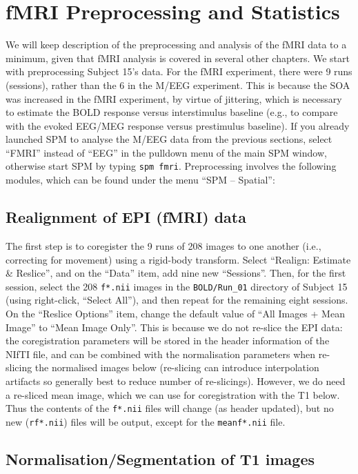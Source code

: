 \section{fMRI Preprocessing and Statistics}

We will keep description of the preprocessing and analysis of the fMRI data to a minimum, given that fMRI analysis is covered in several other chapters. We start with preprocessing Subject 15's data. For the fMRI experiment, there were 9 runs (sessions), rather than the 6 in the M/EEG experiment. This is because the SOA was increased in the fMRI experiment, by virtue of jittering, which is necessary to estimate the BOLD response versus interstimulus baseline (e.g., to compare with the evoked EEG/MEG response versus prestimulus baseline). If you already launched SPM to analyse the M/EEG data from the previous sections, select ``FMRI'' instead of ``EEG'' in the pulldown menu of the main SPM window, otherwise start SPM by typing \texttt{spm fmri}. Preprocessing involves the following modules, which can be found under the menu ``SPM -- Spatial'':

\subsection{Realignment of EPI (fMRI) data}

The first step is to coregister the 9 runs of 208 images to one another (i.e., correcting for movement) using a rigid-body transform. Select ``Realign: Estimate \& Reslice'', and on the ``Data'' item, add nine new ``Sessions''. Then, for the first session, select the 208 \texttt{f*.nii} images in the \texttt{BOLD/Run\_01} directory of Subject 15 (using right-click, ``Select All''), and then repeat for the remaining eight sessions. On the ``Reslice Options'' item, change the default value of ``All Images + Mean Image'' to ``Mean Image Only''. This is because we do not re-slice the EPI data: the coregistration parameters will be stored in the header information of the NIfTI file, and can be combined with the normalisation parameters when re-slicing the normalised images below (re-slicing can introduce interpolation artifacts so generally best to reduce number of re-slicings). However, we do need a re-sliced mean image, which we can use for coregistration with the T1 below. Thus the contents of the \texttt{f*.nii} files will change (as header updated), but no new (\texttt{rf*.nii}) files will be output, except for the \texttt{meanf*.nii} file.

\subsection{Normalisation/Segmentation of T1 images}

